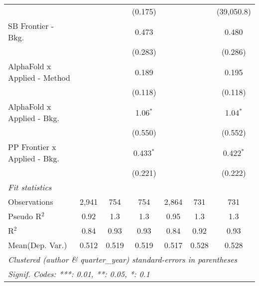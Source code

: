 \begin{tabular}{lcccccc}
                                &             &             & (0.175)     &              &             & (39,050.8)\\   
   SB Frontier - Bkg.           &             &             & 0.473       &              &             & 0.480\\   
                                &             &             & (0.283)     &              &             & (0.286)\\   
   AlphaFold x Applied - Method &             &             & 0.189       &              &             & 0.195\\   
                                &             &             & (0.118)     &              &             & (0.118)\\   
   AlphaFold x Applied - Bkg.   &             &             & 1.06$^{*}$  &              &             & 1.04$^{*}$\\   
                                &             &             & (0.550)     &              &             & (0.552)\\   
   PP Frontier x Applied - Bkg. &             &             & 0.433$^{*}$ &              &             & 0.422$^{*}$\\   
                                &             &             & (0.221)     &              &             & (0.222)\\   
   \midrule
   \emph{Fit statistics}\\
   Observations                 & 2,941       & 754         & 754         & 2,864        & 731         & 731\\  
   Pseudo R$^2$                 & 0.92        & 1.3         & 1.3         & 0.95         & 1.3         & 1.3\\  
   R$^2$                        & 0.84        & 0.93        & 0.93        & 0.84         & 0.92        & 0.93\\  
Mean(Dep. Var.) & 0.512 & 0.519 & 0.519 & 0.517 & 0.528 & 0.528 \\
   \midrule \midrule
   \multicolumn{7}{l}{\emph{Clustered (author \& quarter\_year) standard-errors in parentheses}}\\
   \multicolumn{7}{l}{\emph{Signif. Codes: ***: 0.01, **: 0.05, *: 0.1}}\\
\end{tabular}
\par\endgroup

